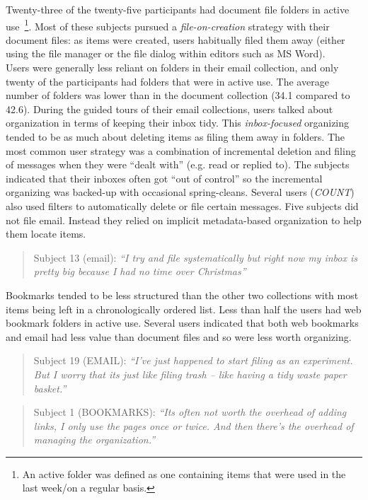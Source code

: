\noindent
Twenty-three of the twenty-five participants had document file folders in active use~\footnote{An active folder was defined as one containing items that were used in the last week/on a regular basis.}. Most of these subjects pursued a \textit{file-on-creation} strategy with their document files: as items were created, users habitually filed them away (either using the file manager or the file dialog within editors such as MS Word).
\\

\noindent %
Users were generally less reliant on folders in their email collection, and only twenty of the participants had folders that were in active use.  The average number of folders was lower than in the document collection (34.1 compared to 42.6).
During the guided tours of their email collections, users talked about organization in terms of keeping their inbox tidy.
This \textit{inbox-focused} organizing tended to be as much about deleting items as filing them away in folders. 
The most common user strategy was a combination of incremental deletion and filing of messages when they were ``dealt with'' (e.g. read or replied to).  The subjects indicated that their inboxes often got ``out of control'' so the incremental organizing was backed-up with occasional spring-cleans. Several users (\textit{COUNT}) also used filters to automatically delete or file certain messages.  Five subjects did not file email. Instead they relied on implicit metadata-based organization to help them locate items.

\begin{quote}
	Subject 13 (email): \textit{``I try and file systematically but right now my inbox is pretty big because I had no time over Christmas''}
\end{quote}

\noindent
Bookmarks tended to be less structured than the other two collections with most items being left in a chronologically ordered list.  Less than half the users had web bookmark folders in active use. 
Several users indicated that both web bookmarks and email had less value than document files and so were less worth organizing.

\begin{quote}
	Subject 19 (EMAIL): \textit{``I've just happened to start filing as an experiment.  But I worry that its just like filing trash -- like having a tidy waste paper basket.''}
\end{quote}

\begin{quote}
Subject 1 (BOOKMARKS): \textit{``Its often not worth the overhead of adding links, I only use the pages once or twice. And then there's the overhead of managing the organization.''}
\end{quote}

